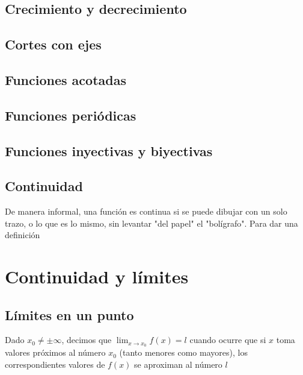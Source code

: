 
\subsection{Crecimiento y decrecimiento}
\subsection{Cortes con ejes}
\subsection{Funciones acotadas}
\subsection{Funciones periódicas}
\subsection{Funciones inyectivas y biyectivas}
\subsection{Continuidad}
De manera informal, una función es continua si se puede dibujar con un solo trazo, o lo que es lo mismo, sin levantar "del papel" el "bolígrafo". Para dar una definición


\section{Continuidad y límites}
\subsection{Límites en un punto}
Dado $x_0\neq\pm\infty$, decimos que $\lim_{x \to x_0} f(x) = l $ cuando ocurre que si $x$ toma valores próximos al número $x_0$ (tanto menores como mayores), los correspondientes valores de $f (x)$ se aproximan al número $l$

